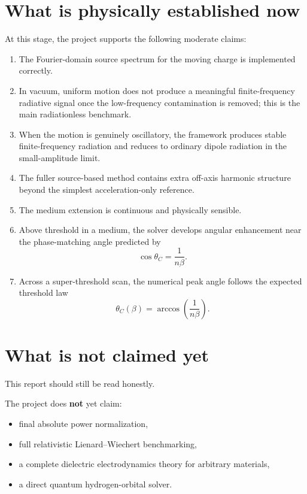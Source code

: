 \documentclass[11pt]{article}
\begin{document}
\section{What is physically established now}

At this stage, the project supports the following moderate claims:

\begin{enumerate}
    \item The Fourier-domain source spectrum for the moving charge is implemented correctly.
    \item In vacuum, uniform motion does not produce a meaningful finite-frequency radiative signal once the low-frequency contamination is removed; this is the main radiationless benchmark.
    \item When the motion is genuinely oscillatory, the framework produces stable finite-frequency radiation and reduces to ordinary dipole radiation in the small-amplitude limit.
    \item The fuller source-based method contains extra off-axis harmonic structure beyond the simplest acceleration-only reference.
    \item The medium extension is continuous and physically sensible.
    \item Above threshold in a medium, the solver develops angular enhancement near the phase-matching angle predicted by
    \[
    \cos\theta_C=\frac{1}{n\beta}.
    \]
    \item Across a super-threshold scan, the numerical peak angle follows the expected threshold law
    \[
    \theta_C(\beta)=\arccos\!\left(\frac{1}{n\beta}\right).
    \]
\end{enumerate}

\section{What is not claimed yet}

This report should still be read honestly.

The project does \textbf{not} yet claim:

\begin{itemize}
    \item final absolute power normalization,
    \item full relativistic Lienard--Wiechert benchmarking,
    \item a complete dielectric electrodynamics theory for arbitrary materials,
    \item a direct quantum hydrogen-orbital solver.
\end{itemize}
\end{document}
